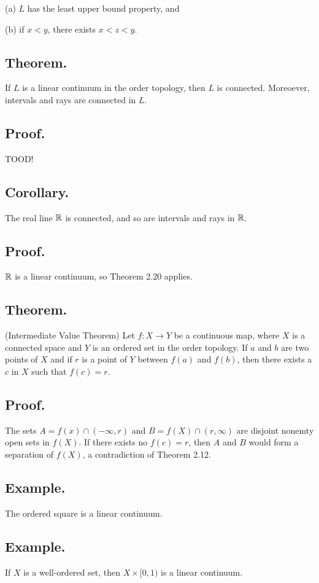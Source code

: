 \documentclass[titlepage]{article}
\begin{document}
(a) $L$ has the least upper bound property, and 

(b) if $x < y$, there exists $x < z < y$.

\subsection{Theorem.} If $L$ is a linear continuum in the order topology, then $L$ is connected. Moreoever, intervals and rays are connected in $L$.

\subsection{Proof.} TOOD!

\subsection{Corollary.} The real line $\mathbb{R}$ is connected, and so are intervals and rays in $\mathbb{R}$.

\subsection{Proof.} $\mathbb{R}$ is a linear continuum, so Theorem 2.20 applies.

\subsection{Theorem.} (Intermediate Value Theorem) Let $f: X \to Y$ be a continuous map, where $X$ is a connected space and $Y$ is an ordered set in the order topology. If $a$ and $b$ are two points of $X$ and if $r$ is a point of $Y$ between $f(a)$ and $f(b)$, then there exists a $c$ in $X$ such that $f(c) = r$.

\subsection{Proof.} The sets $A = f(x) \cap (-\infty, r)$ and $B = f(X) \cap (r, \infty)$ are disjoint nonemty open sets in $f(X)$. If there exists no $f(c) = r$, then $A$ and $B$ would form a separation of $f(X)$, a contradiction of Theorem 2.12.

\subsection{Example.} The ordered square is a linear continuum.

\subsection{Example.} If $X$ is a well-ordered set, then $X \times [0, 1)$ is a linear continuum.
\end{document}
